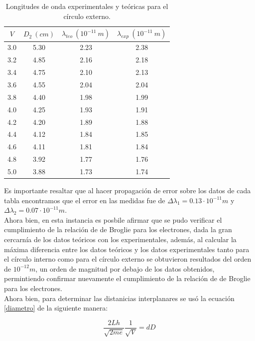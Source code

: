 \documentclass[prb,aps,twocolumn,preprintnumbers,amsmath,amssymb]{revtex4}
\begin{document}
\begin{table}[h!]
	\caption{\label{Tabla 3}Longitudes de onda experimentales y teóricas para el círculo externo.}
	\begin{ruledtabular}
		\begin{tabular}{|cccc|}
			$V$ & $D_{2}\ (cm)$ & $\lambda_{teo}\ (10^{-11}\ m)$ & $\lambda_{exp}\ (10^{-11}\ m)$\\
			\hline
			3.0 & 5.30 & 2.23 & 2.38\\
			3.2 & 4.85 & 2.16 & 2.18\\
			3.4 & 4.75 & 2.10 & 2.13\\
			3.6 & 4.55 & 2.04 & 2.04\\
			3.8 & 4.40 & 1.98 & 1.99\\
			4.0 & 4.25 & 1.93 & 1.91\\
			4.2 & 4.20 & 1.89 & 1.88\\
			4.4 & 4.12 & 1.84 & 1.85\\
			4.6 & 4.11 & 1.81 & 1.84\\
			4.8 & 3.92 & 1.77 & 1.76\\
			5.0 & 3.88 & 1.73 & 1.74\\
		\end{tabular}
	\end{ruledtabular}
\end{table}

Es importante resaltar que al hacer propagación de error \footnotemark[3] sobre los datos de cada tabla encontramos que el error en las medidas fue de $\Delta \lambda_{1} = 0.13  \cdot 10^{-11} m$ y $\Delta \lambda_{2} = 0.07 \cdot 10^{-11} m$.\\

Ahora bien, en esta instancia es posbile afirmar que se pudo verificar el cumplimiento de la relación de de Broglie para los electrones, dada la gran cercarnía de los datos teóricos con los experimentales, además, al calcular la máxima diferencia entre los datos teóricos y los datos experimentales tanto para el círculo interno como para el círculo externo se obtuvieron resultados del orden de $10^{-12} m$, un orden de magnitud por debajo de los datos obtenidos, permintiendo confirmar nuevamente el cumplimiento de la relación de de Broglie para los electrones.\\

Ahora bien, para determinar las distanicias interplanares se usó la ecuación \eqref{diametro} de la siguiente manera:

\begin{equation}
\label{diametro2}
\frac{2Lh}{\sqrt{2me}} \frac{1}{\sqrt{V}} = dD
\end{equation}
\end{document}
